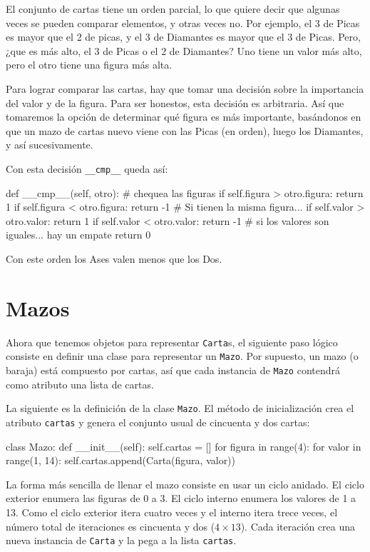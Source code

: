 El conjunto de cartas tiene un orden parcial, lo que quiere decir
que algunas veces se pueden comparar elementos, y otras veces no.
Por ejemplo, el 3 de Picas es mayor que el 2 de picas, y el 3 de Diamantes
es mayor que el 3 de Picas. Pero, ¿que es más alto, el 3 de Picas
o el 2 de Diamantes? Uno tiene un valor más alto, pero el otro tiene
una figura más alta.


Para lograr comparar las cartas, hay que tomar una decisión sobre
la importancia del valor y de la figura. Para ser honestos, esta decisión
es arbitraria. Así que tomaremos la opción de determinar qué figura
es más importante, basándonos en que un mazo de cartas nuevo viene
con las Picas (en orden), luego los Diamantes, y así sucesivamente.

Con esta decisión \texttt{\_\_cmp\_\_} queda así:
\begin{pythoncode}
def __cmp__(self, otro):
  # chequea las figuras
  if self.figura > otro.figura: return 1
  if self.figura < otro.figura: return -1
  # Si tienen la misma figura... 
  if self.valor > otro.valor: return 1
  if self.valor < otro.valor: return -1
  # si los valores son iguales... hay un empate
  return 0
\end{pythoncode}

Con este orden los Ases valen menos que los Dos.

\section{Mazos}

  

Ahora que tenemos objetos para representar \texttt{Carta}s, el siguiente
paso lógico consiste en definir una clase para representar un \texttt{Mazo}.
Por supuesto, un mazo (o baraja) está compuesto por cartas, así que
cada instancia de \texttt{Mazo} contendrá como atributo una lista
de cartas.

 

La siguiente es la definición de la clase \texttt{Mazo}. El método
de inicialización crea el atributo \texttt{cartas} y genera el conjunto
usual de cincuenta y dos cartas:

 

\begin{pythoncode}
class Mazo:
  def __init__(self):
    self.cartas = []
    for figura in range(4):
      for valor in range(1, 14):
        self.cartas.append(Carta(figura, valor))
\end{pythoncode}
 La forma más sencilla de llenar el mazo consiste en usar un ciclo
anidado. El ciclo exterior enumera las figuras de 0 a 3. El ciclo
interno enumera los valores de 1 a 13. Como el ciclo exterior itera
cuatro veces y el interno itera trece veces, el número total de iteraciones
es cincuenta y dos ($4\times13$). Cada iteración crea una nueva instancia
de \texttt{Carta} y la pega a la lista \texttt{cartas}.

